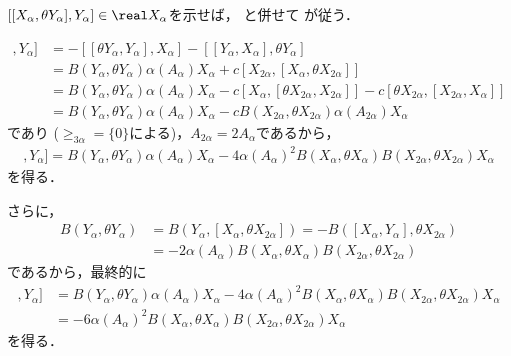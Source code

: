 \begin{npfwn}
  $[[X_{\alpha}, \theta Y_{\alpha}], Y_{\alpha}]  \in \real X_{\alpha} $を示せば， と併せて  が従う．

  
  \begin{align*}
    [[X_{\alpha}, \theta Y_{\alpha}], Y_{\alpha}] &= -[[\theta Y_{\alpha}, Y_{\alpha}], X_{\alpha}] - [[Y_{\alpha}, X_{\alpha}], \theta Y_{\alpha}] \\
                                                  &= B(Y_{\alpha}, \theta Y_{\alpha})\alpha(A_{\alpha})X_{\alpha} +c[X_{2\alpha},[X_{\alpha}, \theta X_{2\alpha}]] \\
                                                  &= B(Y_{\alpha}, \theta Y_{\alpha})\alpha(A_{\alpha})X_{\alpha} - c[X_{\alpha}, [\theta X_{2\alpha}, X_{2\alpha}]] - c[\theta X_{2\alpha},[X_{2\alpha},X_{\alpha}]] \\
                                                  &= B(Y_{\alpha}, \theta Y_{\alpha})\alpha(A_{\alpha})X_{\alpha} - cB(X_{2\alpha},\theta X_{2\alpha})\alpha(A_{2\alpha})X_{\alpha}
  \end{align*}
  であり ($ \ge_{3\alpha} = \{0\} $による)，$A_{2\alpha} = 2A_{\alpha} $であるから，
  \begin{align*}
[[X_{\alpha}, \theta Y_{\alpha}], Y_{\alpha}] =  B(Y_{\alpha}, \theta Y_{\alpha})\alpha(A_{\alpha})X_{\alpha} - 4\alpha(A_{\alpha})^2B(X_{\alpha}, \theta X_{\alpha})B(X_{2\alpha}, \theta X_{2\alpha})X_{\alpha}
  \end{align*}
  を得る．

  さらに，
  \begin{align*}
    B(Y_{\alpha}, \theta Y_{\alpha}) &= B(Y_{\alpha},[X_{\alpha}, \theta X_{2\alpha}]) = -B([X_{\alpha}, Y_{\alpha}], \theta X_{2\alpha}) \\
                                     &= -2\alpha(A_{\alpha})B(X_{\alpha},\theta X_{\alpha})B(X_{2\alpha}, \theta X_{2\alpha})
  \end{align*}
  であるから，最終的に
  \begin{align*}
    [[X_{\alpha}, \theta Y_{\alpha}], Y_{\alpha}] &=  B(Y_{\alpha}, \theta Y_{\alpha})\alpha(A_{\alpha})X_{\alpha} - 4\alpha(A_{\alpha})^2B(X_{\alpha}, \theta X_{\alpha})B(X_{2\alpha}, \theta X_{2\alpha})X_{\alpha} \\
                                                  &= -6\alpha(A_{\alpha})^2B(X_{\alpha}, \theta X_{\alpha})B(X_{2\alpha}, \theta X_{2\alpha})X_{\alpha}
  \end{align*}
を得る．  
\end{npfwn}

